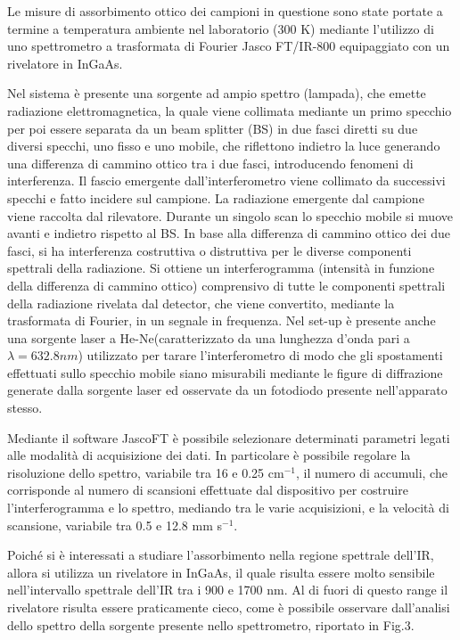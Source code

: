 \documentclass[journal]{IEEEtran}
\begin{document}
Le misure di assorbimento ottico dei campioni in questione sono state portate a termine a temperatura ambiente nel laboratorio (300 K) mediante l'utilizzo di uno spettrometro a trasformata di Fourier Jasco FT/IR-800 equipaggiato con un rivelatore in InGaAs.

Nel sistema è presente una sorgente ad ampio spettro (lampada), che emette radiazione elettromagnetica, la quale viene collimata mediante un primo specchio per poi essere separata da un beam splitter (BS) in due fasci diretti su due diversi specchi, uno fisso e uno mobile, che riflettono indietro la luce generando una differenza di cammino ottico tra i due fasci, introducendo fenomeni di interferenza. Il fascio emergente dall'interferometro viene collimato da successivi specchi e fatto incidere sul campione. La radiazione emergente dal campione viene raccolta dal rilevatore. Durante un singolo scan lo specchio mobile si muove avanti e indietro rispetto al BS. In base alla differenza di cammino ottico dei due fasci, si ha interferenza costruttiva o distruttiva per le diverse componenti spettrali della radiazione. Si ottiene un interferogramma (intensità in funzione della differenza di cammino ottico) comprensivo di tutte le componenti spettrali della radiazione rivelata dal detector, che viene convertito, mediante la trasformata di Fourier, in un segnale in frequenza.
Nel set-up è presente anche una sorgente laser a He-Ne(caratterizzato da una lunghezza d'onda pari a $\lambda = 632.8 nm$) utilizzato per tarare l'interferometro di modo che gli spostamenti effettuati sullo specchio mobile siano misurabili mediante le figure di diffrazione generate dalla sorgente laser ed osservate da un fotodiodo presente nell'apparato stesso.



Mediante il software JascoFT è possibile selezionare determinati parametri legati alle modalità di acquisizione dei dati. In particolare è possibile regolare la risoluzione dello spettro, variabile tra 16 e 0.25 cm$^{-1}$, il numero di accumuli, che corrisponde al numero di scansioni effettuate dal dispositivo per costruire l'interferogramma e lo spettro, mediando tra le varie acquisizioni, e la velocità di scansione, variabile tra 0.5 e 12.8 mm s$^{-1}$.

Poiché si è interessati a studiare l'assorbimento nella regione spettrale dell'IR, allora si utilizza un rivelatore in InGaAs, il quale risulta essere molto sensibile nell'intervallo spettrale dell'IR tra i 900 e 1700 nm. Al di fuori di questo range il rivelatore risulta essere praticamente cieco, come è possibile osservare dall'analisi dello spettro della sorgente presente nello spettrometro, riportato in Fig.3.
\end{document}

